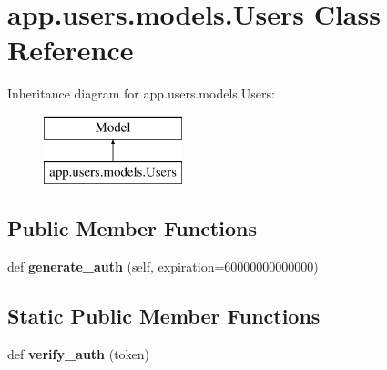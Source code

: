 \hypertarget{classapp_1_1users_1_1models_1_1_users}{}\section{app.\+users.\+models.\+Users Class Reference}
\label{classapp_1_1users_1_1models_1_1_users}
Inheritance diagram for app.\+users.\+models.\+Users\+:\begin{figure}[H]
\begin{center}
\leavevmode
\includegraphics[height=2.000000cm]{classapp_1_1users_1_1models_1_1_users}
\end{center}
\end{figure}
\subsection*{Public Member Functions}
\begin{DoxyCompactItemize}
\item 
\mbox{\label{classapp_1_1users_1_1models_1_1_users_a461b688805d8e521361ef1faf181b1ae}} 
def {\bfseries generate\+\_\+auth} (self, expiration=60000000000000)
\end{DoxyCompactItemize}
\subsection*{Static Public Member Functions}
\begin{DoxyCompactItemize}
\item 
\mbox{\label{classapp_1_1users_1_1models_1_1_users_a1f04be66797fe5e857214ea0f4ab465d}} 
def {\bfseries verify\+\_\+auth} (token)
\end{DoxyCompactItemize}
